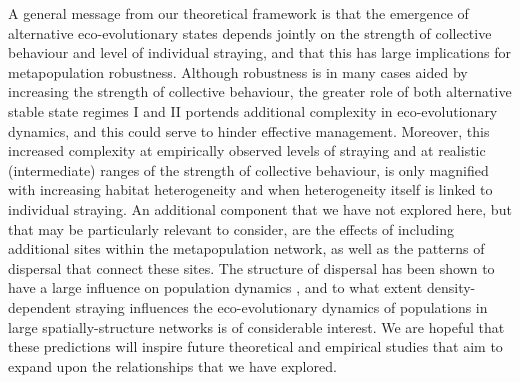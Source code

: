 \documentclass{revtex4}
\begin{document}
A general message from our theoretical framework is that the emergence of alternative eco-evolutionary states depends jointly on the strength of collective behaviour and level of individual straying, and that this has large implications for metapopulation robustness.
Although robustness is in many cases aided by increasing the strength of collective behaviour, the greater role of both alternative stable state regimes I and II portends additional complexity in eco-evolutionary dynamics, and this could serve to hinder effective management.
Moreover, this increased complexity at empirically observed levels of straying \citep{H:2013fs} and at realistic (intermediate) ranges of the strength of collective behaviour, is only magnified with increasing habitat heterogeneity and when heterogeneity itself is linked to individual straying.
An additional component that we have not explored here, but that may be particularly relevant to consider, are the effects of including additional sites within the metapopulation network, as well as the patterns of dispersal that connect these sites.
The structure of dispersal has been shown to have a large influence on population dynamics \citep{Heino:1997vf,Carrara:2014cy,Yeakel:2013vz,Gilarranz:2017fs}, and to what extent density-dependent straying influences the eco-evolutionary dynamics of populations in large spatially-structure networks is of considerable interest.
We are hopeful that these predictions will inspire future theoretical and empirical studies that aim to expand upon the relationships that we have explored.
\end{document}
